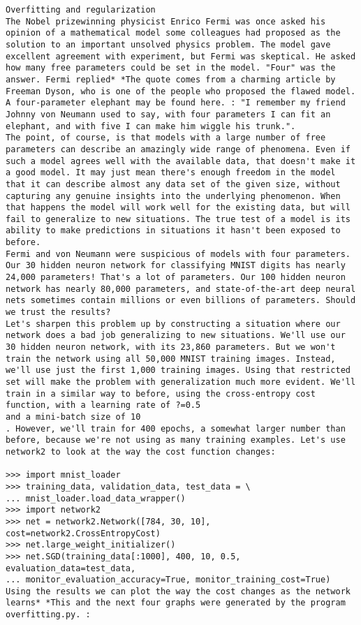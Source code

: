 \begin{lstlisting}
Overfitting and regularization
The Nobel prizewinning physicist Enrico Fermi was once asked his opinion of a mathematical model some colleagues had proposed as the solution to an important unsolved physics problem. The model gave excellent agreement with experiment, but Fermi was skeptical. He asked how many free parameters could be set in the model. "Four" was the answer. Fermi replied* *The quote comes from a charming article by Freeman Dyson, who is one of the people who proposed the flawed model. A four-parameter elephant may be found here. : "I remember my friend Johnny von Neumann used to say, with four parameters I can fit an elephant, and with five I can make him wiggle his trunk.".
The point, of course, is that models with a large number of free parameters can describe an amazingly wide range of phenomena. Even if such a model agrees well with the available data, that doesn't make it a good model. It may just mean there's enough freedom in the model that it can describe almost any data set of the given size, without capturing any genuine insights into the underlying phenomenon. When that happens the model will work well for the existing data, but will fail to generalize to new situations. The true test of a model is its ability to make predictions in situations it hasn't been exposed to before.
Fermi and von Neumann were suspicious of models with four parameters. Our 30 hidden neuron network for classifying MNIST digits has nearly 24,000 parameters! That's a lot of parameters. Our 100 hidden neuron network has nearly 80,000 parameters, and state-of-the-art deep neural nets sometimes contain millions or even billions of parameters. Should we trust the results?
Let's sharpen this problem up by constructing a situation where our network does a bad job generalizing to new situations. We'll use our 30 hidden neuron network, with its 23,860 parameters. But we won't train the network using all 50,000 MNIST training images. Instead, we'll use just the first 1,000 training images. Using that restricted set will make the problem with generalization much more evident. We'll train in a similar way to before, using the cross-entropy cost function, with a learning rate of ?=0.5
and a mini-batch size of 10
. However, we'll train for 400 epochs, a somewhat larger number than before, because we're not using as many training examples. Let's use network2 to look at the way the cost function changes:
 
>>> import mnist_loader 
>>> training_data, validation_data, test_data = \
... mnist_loader.load_data_wrapper()
>>> import network2 
>>> net = network2.Network([784, 30, 10], cost=network2.CrossEntropyCost) 
>>> net.large_weight_initializer()
>>> net.SGD(training_data[:1000], 400, 10, 0.5, evaluation_data=test_data,
... monitor_evaluation_accuracy=True, monitor_training_cost=True)
Using the results we can plot the way the cost changes as the network learns* *This and the next four graphs were generated by the program overfitting.py. :


\end{lstlisting}
